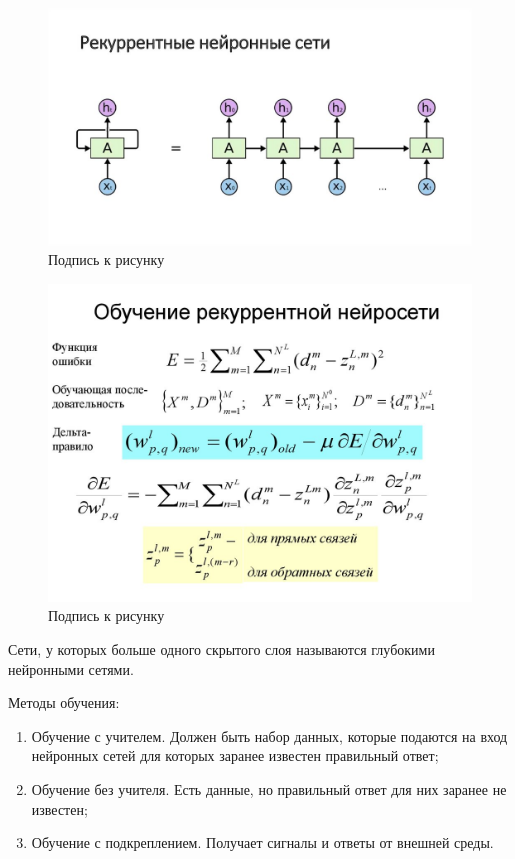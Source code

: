 \documentclass[12pt,a4paper]{report}
\begin{document}
\begin{enumerate}
\begin{figure}
	\centering
	\includegraphics[width=\columnwidth]{rek}
	\caption{Подпись к рисунку}
\end{figure}
\begin{figure}
	\centering
	\includegraphics[width=\columnwidth]{rek2}
	\caption{Подпись к рисунку}
\end{figure}

\end{enumerate}

Сети, у которых больше одного скрытого слоя называются глубокими нейронными сетями. 

Методы обучения:
\begin{enumerate}
	\item Обучение с учителем. Должен быть набор данных, которые подаются на вход нейронных сетей для которых заранее известен правильный ответ;
	\item Обучение без учителя. Есть данные, но правильный ответ для них заранее не известен;
	\item Обучение с подкреплением. Получает сигналы и ответы от внешней среды.
\end{enumerate}
\end{document}
